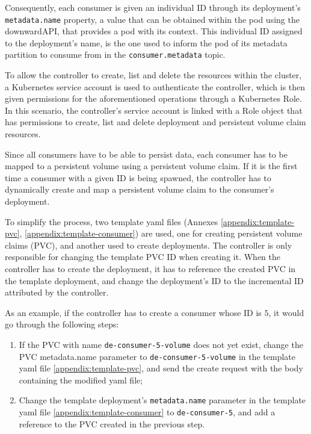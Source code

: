 Consequently, each consumer is given an individual ID through its deployment's
\lstinline{metadata.name} property, a value that can be obtained within the pod
using the downwardAPI, that provides a pod with its context. This individual ID
assigned to the deployment's name, is the one used to inform the pod of its
metadata partition to consume from in the \lstinline{consumer.metadata} topic.

To allow the controller to create, list and delete the resources within the
cluster, a Kubernetes service account is used to authenticate the controller,
which is then given permissions for the aforementioned operations through a
Kubernetes Role. In this scenario, the controller's service account is linked
with a Role object that has permissions to create, list and delete deployment
and persistent volume claim resources.

Since all consumers have to be able to persist data, each consumer has to be
mapped to a persistent volume using a persistent volume claim. If it is the
first time a consumer with a given ID is being spawned, the controller has to
dynamically create and map a persistent volume claim to the consumer's
deployment.

To simplify the process, two template yaml files (Annexes \ref{appendix:template-pvc},
\ref{appendix:template-consumer}) are used, one for creating persistent volume
claims (PVC), and another used to create deployments. The controller is only
responsible for changing the template PVC ID when creating it. When the
controller has to create the deployment, it has to reference the created PVC in
the template deployment, and change the deployment's ID to the incremental ID
attributed by the controller.

As an example, if the controller has to create a consumer whose ID is $5$, it
would go through the following steps: 
\begin{enumerate} 
    \item If the PVC with name \lstinline{de-consumer-5-volume} does not yet
        exist, change the PVC metadata.name parameter to
        \lstinline{de-consumer-5-volume} in the template yaml file
        \ref{appendix:template-pvc}, and send the create request with the body
        containing the modified yaml file;
    \item Change the template deployment's \lstinline{metadata.name} parameter
        in the template yaml file \ref{appendix:template-consumer} to
        \lstinline{de-consumer-5}, and add a reference to the PVC created in the
        previous step.  
\end{enumerate}

